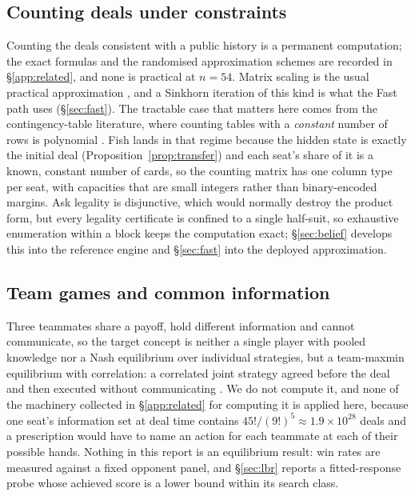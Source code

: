 \subsection{Counting deals under constraints}

Counting the deals consistent with a public history is a permanent computation;
the exact formulas and the randomised approximation schemes are recorded in
\S\ref{app:related}, and none is practical at $n = 54$. Matrix scaling is the
usual practical approximation \cite{lsw}, and a Sinkhorn iteration of this kind
is what the Fast path uses (\S\ref{sec:fast}). The tractable case that matters
here comes from the contingency-table literature, where counting tables with a
\emph{constant} number of rows is polynomial \cite{cryan-dyer}. Fish lands in
that regime because the hidden state is exactly the initial deal
(Proposition~\ref{prop:transfer}) and each seat's share of it is a known,
constant number of cards, so the counting matrix has one column type per seat,
with capacities that are small integers rather than binary-encoded margins. Ask
legality is disjunctive, which would normally destroy the product form, but
every legality certificate is confined to a single half-suit, so
exhaustive enumeration within a block keeps the computation exact; \S\ref{sec:belief}
develops this into the reference engine and \S\ref{sec:fast} into the deployed
approximation.

\subsection{Team games and common information}

Three teammates share a payoff, hold different information and cannot
communicate, so the target concept is neither a single player with pooled
knowledge nor a Nash equilibrium over individual strategies, but a team-maxmin
equilibrium with correlation: a correlated joint strategy agreed before the deal
and then executed without communicating \cite{celli-gatti}. We do not compute it,
and none of the machinery collected in \S\ref{app:related} for computing it is
applied here, because one seat's information set at deal time contains
$45!/(9!)^5 \approx 1.9 \times 10^{28}$ deals and a prescription would have to
name an action for each teammate at each of their possible hands. Nothing in this
report is an equilibrium result: win rates are measured against a fixed opponent
panel, and \S\ref{sec:lbr} reports a fitted-response probe whose achieved score
is a lower bound within its search class.
